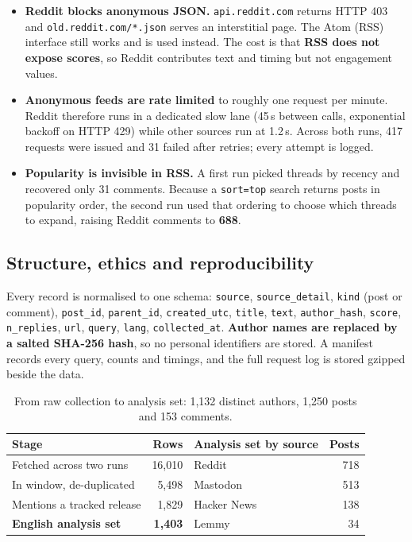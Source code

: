 \documentclass[11pt,a4paper]{article}
\begin{document}
\begin{itemize}[leftmargin=*]
  \item \textbf{Reddit blocks anonymous JSON.} \texttt{api.reddit.com} returns HTTP 403 and \texttt{old.reddit.com/*.json} serves an interstitial page. The Atom (RSS) interface still works and is used instead. The cost is that \textbf{RSS does not expose scores}, so Reddit contributes text and timing but not engagement values.
  \item \textbf{Anonymous feeds are rate limited} to roughly one request per minute. Reddit therefore runs in a dedicated slow lane (45\,s between calls, exponential backoff on HTTP 429) while other sources run at 1.2\,s. Across both runs, 417 requests were issued and 31 failed after retries; every attempt is logged.
  \item \textbf{Popularity is invisible in RSS.} A first run picked threads by recency and recovered only 31 comments. Because a \texttt{sort=top} search returns posts in popularity order, the second run used that ordering to choose which threads to expand, raising Reddit comments to \textbf{688}.
\end{itemize}

\subsection{Structure, ethics and reproducibility}

Every record is normalised to one schema: \texttt{source}, \texttt{source\_detail}, \texttt{kind} (post or comment), \texttt{post\_id}, \texttt{parent\_id}, \texttt{created\_utc}, \texttt{title}, \texttt{text}, \texttt{author\_hash}, \texttt{score}, \texttt{n\_replies}, \texttt{url}, \texttt{query}, \texttt{lang}, \texttt{collected\_at}. \textbf{Author names are replaced by a salted SHA-256 hash}, so no personal identifiers are stored. A manifest records every query, counts and timings, and the full request log is stored gzipped beside the data.

\begin{table}[H]
\centering\small
\begin{tabular}{@{}lrlr@{}}
\toprule
\textbf{Stage} & \textbf{Rows} & \textbf{Analysis set by source} & \textbf{Posts} \\
\midrule
Fetched across two runs      & 16,010 & Reddit      & 718 \\
In window, de-duplicated     & 5,498  & Mastodon    & 513 \\
Mentions a tracked release   & 1,829  & Hacker News & 138 \\
\textbf{English analysis set}& \textbf{1,403} & Lemmy & 34 \\
\bottomrule
\end{tabular}
\caption{From raw collection to analysis set: 1,132 distinct authors, 1,250 posts and 153 comments.}
\end{table}
\end{document}
